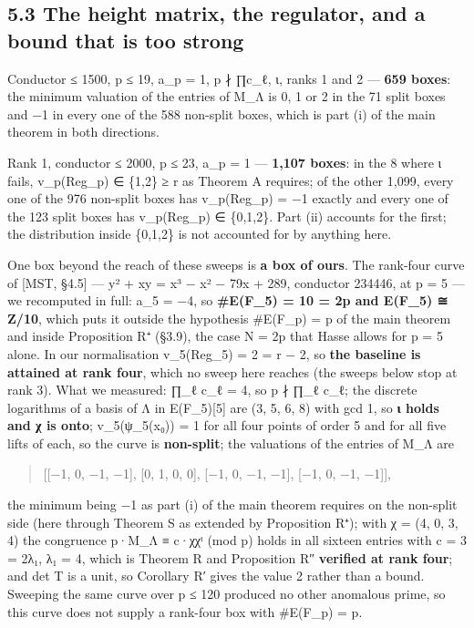 \documentclass[11pt,a4paper]{article}
\theoremstyle{named}
\begin{document}
\subsection*{5.3 The height matrix, the regulator, and a bound that is too strong}

Conductor ≤ 1500, p ≤ 19, a\_p = 1, p ∤ ∏c\_ℓ, ι, ranks 1 and 2 — \textbf{659 boxes}: the minimum valuation of the entries of M\_Λ is 0, 1 or 2 in the 71 split boxes and −1 in every one of the 588 non-split boxes, which is part (i) of the main theorem in both directions.

Rank 1, conductor ≤ 2000, p ≤ 23, a\_p = 1 — \textbf{1,107 boxes}: in the 8 where ι fails, v\_p(Reg\_p) ∈ \{1,2\} ≥ r as Theorem A requires; of the other 1,099, every one of the 976 non-split boxes has v\_p(Reg\_p) = −1 exactly and every one of the 123 split boxes has v\_p(Reg\_p) ∈ \{0,1,2\}. Part (ii) accounts for the first; the distribution inside \{0,1,2\} is not accounted for by anything here.

One box beyond the reach of these sweeps is \textbf{a box of ours}. The rank-four curve of [MST, §4.5] — y² + xy = x³ − x² − 79x + 289, conductor 234446, at p = 5 — we recomputed in full: a\_5 = −4, so \textbf{\#E(F\_5) = 10 = 2p and E(F\_5) ≅ Z/10}, which puts it outside the hypothesis \#E(F\_p) = p of the main theorem and inside Proposition R⁺ (§3.9), the case N = 2p that Hasse allows for p = 5 alone. In our normalisation v\_5(Reg\_5) = 2 = r − 2, so \textbf{the baseline is attained at rank four}, which no sweep here reaches (the sweeps below stop at rank 3). What we measured: ∏\_ℓ c\_ℓ = 4, so p ∤ ∏\_ℓ c\_ℓ; the discrete logarithms of a basis of Λ in E(F\_5)[5] are (3, 5, 6, 8) with gcd 1, so \textbf{ι holds and χ is onto}; v\_5(ψ\_5(x₀)) = 1 for all four points of order 5 and for all five lifts of each, so the curve is \textbf{non-split}; the valuations of the entries of M\_Λ are

\begin{quote}
[[−1, 0, −1, −1], [0, 1, 0, 0], [−1, 0, −1, −1], [−1, 0, −1, −1]],
\end{quote}

the minimum being −1 as part (i) of the main theorem requires on the non-split side (here through Theorem S as extended by Proposition R⁺); with χ = (4, 0, 3, 4) the congruence p·M\_Λ ≡ c·χχᵗ (mod p) holds in all sixteen entries with c = 3 = 2λ₁, λ₁ = 4, which is Theorem R and Proposition R″ \textbf{verified at rank four}; and det T is a unit, so Corollary R′ gives the value 2 rather than a bound. Sweeping the same curve over p ≤ 120 produced no other anomalous prime, so this curve does not supply a rank-four box with \#E(F\_p) = p.
\end{document}
